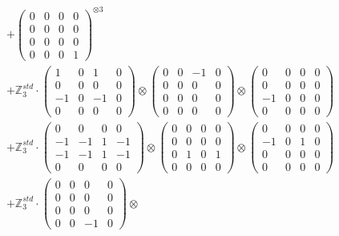 \documentclass{article}
\begin{document}
{\begin{align}
        &+ \label{Rs16-Rc11-Solution-9-c16} \begin{pmatrix} 0 & 0 & 0 & 0 \\ 0 & 0 & 0 & 0 \\ 0 & 0 & 0 & 0 \\ 0 & 0 & 0 & 1 \end{pmatrix}^{\otimes 3} \\
        &+ \label{Rs16-Rc11-Solution-9-c17} \mathbb{Z}_3^{std} \cdot 
            \begin{pmatrix} 1 & 0 & 1 & 0 \\ 0 & 0 & 0 & 0 \\ -1 & 0 & -1 & 0 \\ 0 & 0 & 0 & 0 \end{pmatrix} \otimes 
            \begin{pmatrix} 0 & 0 & -1 & 0 \\ 0 & 0 & 0 & 0 \\ 0 & 0 & 0 & 0 \\ 0 & 0 & 0 & 0 \end{pmatrix} \otimes 
            \begin{pmatrix} 0 & 0 & 0 & 0 \\ 0 & 0 & 0 & 0 \\ -1 & 0 & 0 & 0 \\ 0 & 0 & 0 & 0 \end{pmatrix} \\ 
        &+ \label{Rs16-Rc11-Solution-9-c18} \mathbb{Z}_3^{std} \cdot 
            \begin{pmatrix} 0 & 0 & 0 & 0 \\ -1 & -1 & 1 & -1 \\ -1 & -1 & 1 & -1 \\ 0 & 0 & 0 & 0 \end{pmatrix} \otimes 
            \begin{pmatrix} 0 & 0 & 0 & 0 \\ 0 & 0 & 0 & 0 \\ 0 & 1 & 0 & 1 \\ 0 & 0 & 0 & 0 \end{pmatrix} \otimes 
            \begin{pmatrix} 0 & 0 & 0 & 0 \\ -1 & 0 & 1 & 0 \\ 0 & 0 & 0 & 0 \\ 0 & 0 & 0 & 0 \end{pmatrix} \\ 
        &+ \label{Rs16-Rc11-Solution-9-c19} \mathbb{Z}_3^{std} \cdot 
            \begin{pmatrix} 0 & 0 & 0 & 0 \\ 0 & 0 & 0 & 0 \\ 0 & 0 & 0 & 0 \\ 0 & 0 & -1 & 0 \end{pmatrix} \otimes 

\end{align}}
\end{document}
